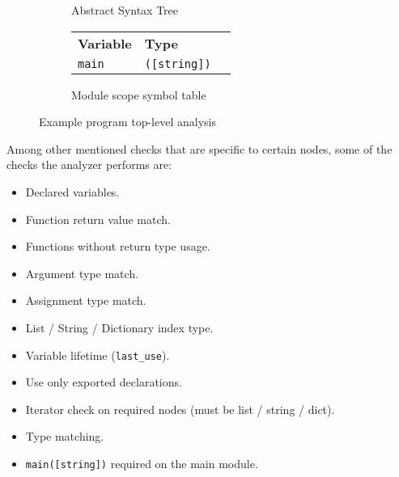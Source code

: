 \begin{figure}[H]
\begin{subfigure}{0.45\textwidth}
		\caption{Abstract Syntax Tree}
	\end{subfigure}
    \begin{subfigure}{0.45\textwidth}
		\centering
        \begin{tabular}{ l l l }
            \textbf{Variable} & \textbf{Type} \\
            \texttt{main} & \texttt{([string])} \\
		\end{tabular}
		\caption{Module scope symbol table}
	\end{subfigure}
	\caption{Example program top-level analysis}
    \label{fig:ast_example}
\end{figure}

Among other mentioned checks that are specific to certain nodes, some of the checks the analyzer performs are:

\begin{itemize}
    \item Declared variables.
    \item Function return value match.
    \item Functions without return type usage.
    \item Argument type match.
    \item Assignment type match.
    \item List / String / Dictionary index type.
    \item Variable lifetime (\texttt{last\_use}).
    \item Use only exported declarations.
    \item Iterator check on required nodes (must be list / string / dict).
    \item Type matching.
    \item \texttt{main([string])} required on the main module.
\end{itemize}

